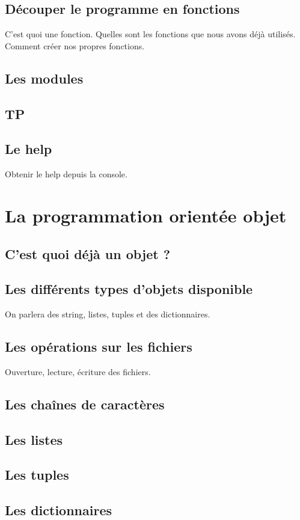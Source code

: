 \documentclass[12pt]{article}
\begin{document}
\clearpage

    \subsection{Découper le programme en fonctions}
        C'est quoi une fonction. Quelles sont les fonctions que nous avons déjà utilisés. Comment créer nos propres
        fonctions.
    \subsection{Les modules}
    \subsection{TP}
    \subsection{Le help}
        Obtenir le help depuis la console.

\section{La programmation orientée objet}
    \subsection{C'est quoi déjà un objet ?}
    \subsection{Les différents types d'objets disponible}
        On parlera des string, listes, tuples et des dictionnaires.
    \subsection{Les opérations sur les fichiers}
        Ouverture, lecture, écriture des fichiers.
    \subsection{Les chaînes de caractères}
    \subsection{Les listes}
    \subsection{Les tuples}
    \subsection{Les dictionnaires}
\end{document}
